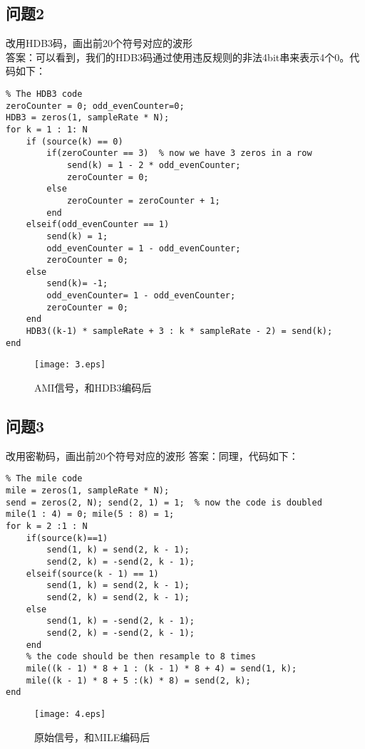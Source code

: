 \documentclass{article}
\begin{document}
\subsection{问题2}改用HDB3码，画出前20个符号对应的波形\\
答案：可以看到，我们的HDB3码通过使用违反规则的非法4bit串来表示4个0。代码如下：
\begin{lstlisting}
% The HDB3 code
zeroCounter = 0; odd_evenCounter=0;
HDB3 = zeros(1, sampleRate * N);
for k = 1 : 1: N
    if (source(k) == 0)
        if(zeroCounter == 3)  % now we have 3 zeros in a row
            send(k) = 1 - 2 * odd_evenCounter;
            zeroCounter = 0;
        else
            zeroCounter = zeroCounter + 1;
        end
    elseif(odd_evenCounter == 1)
        send(k) = 1;
        odd_evenCounter = 1 - odd_evenCounter;
        zeroCounter = 0;
    else
        send(k)= -1;
        odd_evenCounter= 1 - odd_evenCounter;
        zeroCounter = 0;
    end
    HDB3((k-1) * sampleRate + 3 : k * sampleRate - 2) = send(k);
end
\end{lstlisting}
\begin{figure}[!htb]
\begin{center}
		\texttt{[image: 3.eps]}
		\caption{AMI信号，和HDB3编码后}
\end{center}
\end{figure}
\subsection{问题3}改用密勒码，画出前20个符号对应的波形
答案：同理，代码如下：
\begin{lstlisting}
% The mile code
mile = zeros(1, sampleRate * N);
send = zeros(2, N); send(2, 1) = 1;  % now the code is doubled
mile(1 : 4) = 0; mile(5 : 8) = 1;
for k = 2 :1 : N
    if(source(k)==1)
        send(1, k) = send(2, k - 1);
        send(2, k) = -send(2, k - 1);
    elseif(source(k - 1) == 1)
        send(1, k) = send(2, k - 1);
        send(2, k) = send(2, k - 1);
    else
        send(1, k) = -send(2, k - 1);
        send(2, k) = -send(2, k - 1);
    end
    % the code should be then resample to 8 times
    mile((k - 1) * 8 + 1 : (k - 1) * 8 + 4) = send(1, k);
    mile((k - 1) * 8 + 5 :(k) * 8) = send(2, k);
end
\end{lstlisting}
\begin{figure}[!htb]
\begin{center}
		\texttt{[image: 4.eps]}
		\caption{原始信号，和MILE编码后}
\end{center}
\end{figure}
\end{document}

